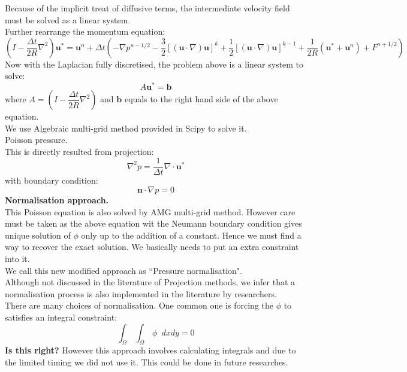 Because of the implicit treat of diffusive terms, the intermediate velocity field must be solved as a linear system.\\
Further rearrange the momentum equation:
\begin{equation}
\left(I - \dfrac{\Delta t}{2R}\nabla^2\right)\textbf{u}^* = \textbf{u}^n + \Delta t\left(-\nabla p^{n-1/2} -\dfrac{3}{2}\left[(\textbf{u}\cdot\nabla)\textbf{u}\right]^k + \dfrac{1}{2}\left[(\textbf{u}\cdot\nabla)\textbf{u}\right]^{k-1} + \dfrac{1}{2R}(\textbf{u}^*+\textbf{u}^n) + F^{n+1/2} \right)
\end{equation}
Now with the Laplacian fully discretised, the problem above is a linear system to solve:
\begin{equation}
A\textbf{u}^* = \textbf{b}
\end{equation}
where $A = \left(I - \dfrac{\Delta t}{2R}\nabla^2\right)$ and $\textbf{b}$ equals to the right hand side of the above equation.\\

We use Algebraic multi-grid method provided in Scipy to solve it.\\

Poisson pressure.\\
This is directly resulted from projection:
\begin{equation}
\nabla^2 p = \dfrac{1}{\Delta t}\nabla \cdot \textbf{u}^*
\end{equation}
with boundary condition:
\begin{equation}
\textbf{n} \cdot \nabla p = 0
\end{equation}
\textbf{Normalisation approach.}\\
This Poisson equation is also solved by AMG multi-grid method. However care must be taken as the above equation wit the Neumann boundary condition gives unique solution of $\phi$ only up to the addition of a constant. Hence we must find a way to recover the exact solution. We basically needs to put an extra constraint into it.\\

We call this new modified approach as ``Pressure normalisation".\\

Although not discussed in the literature of Projection methods, we infer that a normalisation process is also implemented in the literature by researchers.\\

There are many choices of normalisation. One common one is forcing the $\phi$ to satisfies an integral constraint:
\begin{equation}
\int_{\Omega}\,\int_{\Omega}\,\phi \,\,\, dx dy = 0
\end{equation}
\textbf{Is this right?}
However this approach involves calculating integrals and due to the limited timing we did not use it. This could be done in future researches.\\

